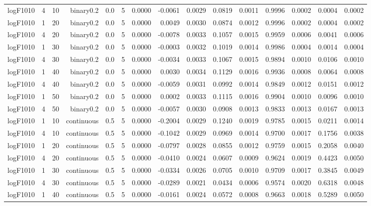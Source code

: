 \begin{longtable}{rrrrrrrrrrrrrrr}
  logF1010 & 4 & 10 & binary0.2 & 0.0 & 5 & 0.0000 & -0.0061 & 0.0029 & 0.0819 & 0.0011 & 0.9996 & 0.0002 & 0.0004 & 0.0002 \\ 
  logF1010 & 1 & 20 & binary0.2 & 0.0 & 5 & 0.0000 & 0.0049 & 0.0030 & 0.0874 & 0.0012 & 0.9996 & 0.0002 & 0.0004 & 0.0002 \\ 
  logF1010 & 4 & 20 & binary0.2 & 0.0 & 5 & 0.0000 & -0.0078 & 0.0033 & 0.1057 & 0.0015 & 0.9959 & 0.0006 & 0.0041 & 0.0006 \\ 
  logF1010 & 1 & 30 & binary0.2 & 0.0 & 5 & 0.0000 & -0.0003 & 0.0032 & 0.1019 & 0.0014 & 0.9986 & 0.0004 & 0.0014 & 0.0004 \\ 
  logF1010 & 4 & 30 & binary0.2 & 0.0 & 5 & 0.0000 & -0.0034 & 0.0033 & 0.1067 & 0.0015 & 0.9894 & 0.0010 & 0.0106 & 0.0010 \\ 
  logF1010 & 1 & 40 & binary0.2 & 0.0 & 5 & 0.0000 & 0.0030 & 0.0034 & 0.1129 & 0.0016 & 0.9936 & 0.0008 & 0.0064 & 0.0008 \\ 
  logF1010 & 4 & 40 & binary0.2 & 0.0 & 5 & 0.0000 & -0.0059 & 0.0031 & 0.0992 & 0.0014 & 0.9849 & 0.0012 & 0.0151 & 0.0012 \\ 
  logF1010 & 1 & 50 & binary0.2 & 0.0 & 5 & 0.0000 & 0.0002 & 0.0033 & 0.1115 & 0.0016 & 0.9904 & 0.0010 & 0.0096 & 0.0010 \\ 
  logF1010 & 4 & 50 & binary0.2 & 0.0 & 5 & 0.0000 & -0.0057 & 0.0030 & 0.0908 & 0.0013 & 0.9833 & 0.0013 & 0.0167 & 0.0013 \\ 
  logF1010 & 1 & 10 & continuous & 0.5 & 5 & 0.0000 & -0.2004 & 0.0029 & 0.1240 & 0.0019 & 0.9785 & 0.0015 & 0.0211 & 0.0014 \\ 
  logF1010 & 4 & 10 & continuous & 0.5 & 5 & 0.0000 & -0.1042 & 0.0029 & 0.0969 & 0.0014 & 0.9700 & 0.0017 & 0.1756 & 0.0038 \\ 
  logF1010 & 1 & 20 & continuous & 0.5 & 5 & 0.0000 & -0.0797 & 0.0028 & 0.0855 & 0.0012 & 0.9759 & 0.0015 & 0.2058 & 0.0040 \\ 
  logF1010 & 4 & 20 & continuous & 0.5 & 5 & 0.0000 & -0.0410 & 0.0024 & 0.0607 & 0.0009 & 0.9624 & 0.0019 & 0.4423 & 0.0050 \\ 
  logF1010 & 1 & 30 & continuous & 0.5 & 5 & 0.0000 & -0.0334 & 0.0026 & 0.0705 & 0.0010 & 0.9709 & 0.0017 & 0.3845 & 0.0049 \\ 
  logF1010 & 4 & 30 & continuous & 0.5 & 5 & 0.0000 & -0.0289 & 0.0021 & 0.0434 & 0.0006 & 0.9574 & 0.0020 & 0.6318 & 0.0048 \\ 
  logF1010 & 1 & 40 & continuous & 0.5 & 5 & 0.0000 & -0.0161 & 0.0024 & 0.0572 & 0.0008 & 0.9663 & 0.0018 & 0.5289 & 0.0050 \\ 

\end{longtable}
